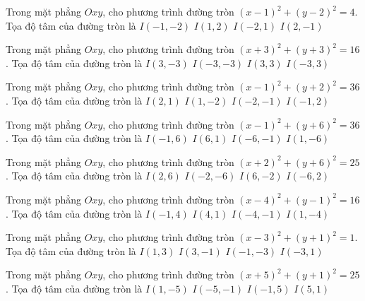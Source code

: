 \begin{ex}
Trong mặt phẳng $Oxy$, cho phương trình đường tròn $(x -1)^2   + (y -2)^2 = 4$. Tọa độ tâm của đường tròn là
\choice
{ $I(-1, -2)$ }
{ \True $I(1, 2)$ }
{ $I(-2, 1)$ }
{ $I(2, -1)$ }
\end{ex}

\begin{ex}
Trong mặt phẳng $Oxy$, cho phương trình đường tròn $(x + 3)^2  + (y + 3)^2 = 16$. Tọa độ tâm của đường tròn là
\choice
{ $I(3, -3)$ }
{ \True $I(-3, -3)$ }
{ $I(3, 3)$ }
{ $I(-3, 3)$ }
\end{ex}

\begin{ex}
Trong mặt phẳng $Oxy$, cho phương trình đường tròn $(x -1)^2   + (y + 2)^2 = 36$. Tọa độ tâm của đường tròn là
\choice
{ $I(2, 1)$ }
{ \True $I(1, -2)$ }
{ $I(-2, -1)$ }
{ $I(-1, 2)$ }
\end{ex}

\begin{ex}
Trong mặt phẳng $Oxy$, cho phương trình đường tròn $(x -1)^2   + (y + 6)^2 = 36$. Tọa độ tâm của đường tròn là
\choice
{ $I(-1, 6)$ }
{ $I(6, 1)$ }
{ $I(-6, -1)$ }
{ \True $I(1, -6)$ }
\end{ex}

\begin{ex}
Trong mặt phẳng $Oxy$, cho phương trình đường tròn $(x + 2)^2  + (y + 6)^2 = 25$. Tọa độ tâm của đường tròn là
\choice
{ $I(2, 6)$ }
{ \True $I(-2, -6)$ }
{ $I(6, -2)$ }
{ $I(-6, 2)$ }
\end{ex}

\begin{ex}
Trong mặt phẳng $Oxy$, cho phương trình đường tròn $(x -4)^2   + (y -1)^2 = 16$. Tọa độ tâm của đường tròn là
\choice
{ $I(-1, 4)$ }
{ \True $I(4, 1)$ }
{ $I(-4, -1)$ }
{ $I(1, -4)$ }
\end{ex}

\begin{ex}
Trong mặt phẳng $Oxy$, cho phương trình đường tròn $(x -3)^2   + (y + 1)^2 = 1$. Tọa độ tâm của đường tròn là
\choice
{ $I(1, 3)$ }
{ \True $I(3, -1)$ }
{ $I(-1, -3)$ }
{ $I(-3, 1)$ }
\end{ex}

\begin{ex}
Trong mặt phẳng $Oxy$, cho phương trình đường tròn $(x + 5)^2  + (y + 1)^2 = 25$. Tọa độ tâm của đường tròn là
\choice
{ $I(1, -5)$ }
{ \True $I(-5, -1)$ }
{ $I(-1, 5)$ }
{ $I(5, 1)$ }
\end{ex}


